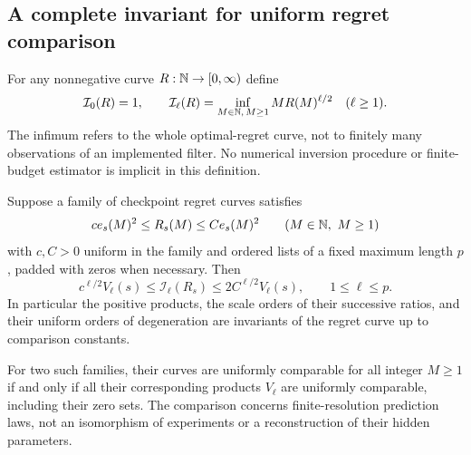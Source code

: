 \subsection{A complete invariant for uniform regret comparison}
For any nonnegative curve $R:\mathbb N\to[0,\infty)$ define
\begin{equation}\label{eq:operational-volume-transform}
 \mathcal I_0(R)=1,\qquad
 \mathcal I_\ell(R)=\inf_{M\in\mathbb N,\,M\ge1}
                       M R(M)^{\ell/2}\quad(\ell\ge1).
\end{equation}
The infimum refers to the whole optimal-regret curve, not to finitely
many observations of an implemented filter. No numerical inversion
procedure or finite-budget estimator is implicit in this definition.

\begin{theorem}
\label{thm:operational-reconstruction}
Suppose a family of checkpoint regret curves satisfies
\begin{equation}\label{eq:reconstruction-hypothesis}
 c e_s(M)^2\le R_s(M)\le C e_s(M)^2
 \qquad(M\in\mathbb N,\ M\ge1)
\end{equation}
with $c,C>0$ uniform in the family and ordered lists of a fixed
maximum length $p$, padded with zeros when necessary. Then
\begin{equation}\label{eq:risk-recovers-products}
 c^{\ell/2}V_\ell(s)\le\mathcal I_\ell(R_s)
             \le2C^{\ell/2}V_\ell(s),\qquad 1\le\ell\le p.
\end{equation}
In particular the positive products, the scale orders of their successive
ratios, and their uniform orders of degeneration are
invariants of the regret curve up to comparison constants.

For two such families, their curves are uniformly comparable for all
integer $M\ge1$ if and only if all their corresponding products
$V_\ell$ are uniformly comparable, including their zero sets.
The comparison concerns finite-resolution prediction laws, not an
isomorphism of experiments or a reconstruction of their hidden parameters.
\end{theorem}
